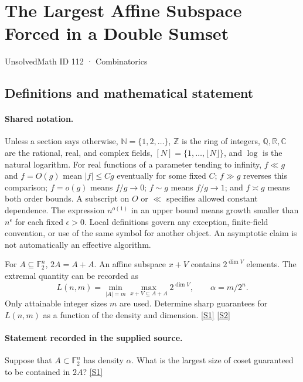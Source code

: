 \documentclass[11pt,a4paper]{article}
\newcommand{\N}{\mathbb{N}}
\newcommand{\Z}{\mathbb{Z}}
\newcommand{\Q}{\mathbb{Q}}
\newcommand{\R}{\mathbb{R}}
\newcommand{\C}{\mathbb{C}}
\newcommand{\F}{\mathbb{F}}
\newcommand{\sref}[2]{\hyperlink{source:#1:#2}{[S#2]}}
\begin{document}

\setcounter{section}{111}

\section{The Largest Affine Subspace Forced in a Double Sumset}\label{112}

{\small\sffamily UnsolvedMath ID 112 · Combinatorics}

\subsection{Definitions and mathematical statement}

\paragraph{Shared notation.}Unless a section says otherwise, $\N=\{1,2,\ldots\}$,
$\Z$ is the ring of integers, $\Q,\R,\C$ are the rational, real, and complex
fields, $[N]=\{1,\ldots,\lfloor N\rfloor\}$, and $\log$ is the natural
logarithm. For real functions of a parameter tending to infinity,
$f\ll g$ and $f=O(g)$ mean $|f|\leq Cg$ eventually for some fixed $C$;
$f\gg g$ reverses this comparison; $f=o(g)$ means $f/g\to0$;
$f\sim g$ means $f/g\to1$; and $f\asymp g$ means both order bounds.
A subscript on $O$ or $\ll$ specifies allowed constant dependence.
The expression $n^{o(1)}$ in an upper bound means growth smaller than
$n^\epsilon$ for each fixed $\epsilon>0$. Local definitions govern any
exception, finite-field convention, or use of the same symbol for another
object. An asymptotic claim is not automatically an effective algorithm.



For $A\subseteq\F_2^n$, $2A=A+A$. An affine subspace $x+V$ contains $2^{\dim V}$ elements. The extremal quantity can be recorded as
\[L(n,m)=\min_{|A|=m}\max_{x+V\subseteq A+A}2^{\dim V},\qquad\alpha=m/2^n.\]
Only attainable integer sizes $m$ are used. Determine sharp guarantees for $L(n,m)$ as a function of the density and dimension. \sref{112}{1} \sref{112}{2}

\paragraph{Statement recorded in the supplied source.}
Suppose that $A \subset \mathbb{F}_2^n$ has density $\alpha$. What is the largest size of coset guaranteed to be contained in $2A$? \sref{112}{1}
\end{document}
